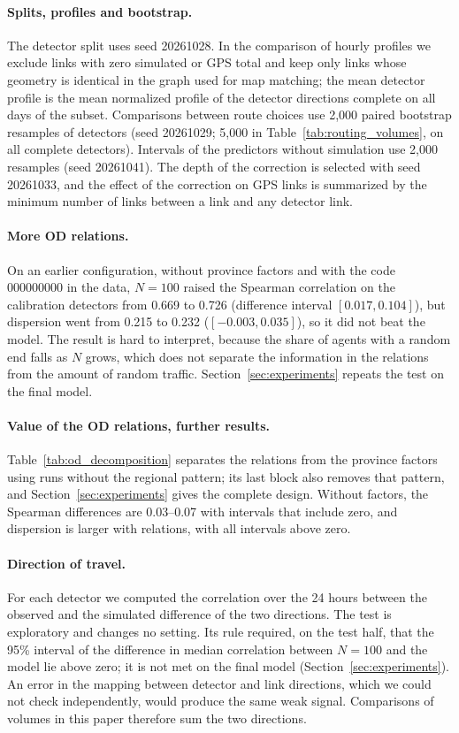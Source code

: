 \documentclass[11pt,a4paper]{article}
\begin{document}
\paragraph{Splits, profiles and bootstrap.} The detector split uses seed 20261028. In the comparison of hourly profiles we exclude links with zero simulated or GPS total and keep only links whose geometry is identical in the graph used for map matching; the mean detector profile is the mean normalized profile of the detector directions complete on all days of the subset. Comparisons between route choices use 2,000 paired bootstrap resamples of detectors (seed 20261029; 5,000 in Table~\ref{tab:routing_volumes}, on all complete detectors). Intervals of the predictors without simulation use 2,000 resamples (seed 20261041). The depth of the correction is selected with seed 20261033, and the effect of the correction on GPS links is summarized by the minimum number of links between a link and any detector link.

\paragraph{More OD relations.} On an earlier configuration, without province factors and with the code 000000000 in the data, $N=100$ raised the Spearman correlation on the calibration detectors from 0.669 to 0.726 (difference interval $[0.017, 0.104]$), but dispersion went from 0.215 to 0.232 ($[-0.003, 0.035]$), so it did not beat the model. The result is hard to interpret, because the share of agents with a random end falls as $N$ grows, which does not separate the information in the relations from the amount of random traffic. Section~\ref{sec:experiments} repeats the test on the final model.

\paragraph{Value of the OD relations, further results.} Table~\ref{tab:od_decomposition} separates the relations from the province factors using runs without the regional pattern; its last block also removes that pattern, and Section~\ref{sec:experiments} gives the complete design. Without factors, the Spearman differences are 0.03--0.07 with intervals that include zero, and dispersion is larger with relations, with all intervals above zero.

\paragraph{Direction of travel.} For each detector we computed the correlation over the 24 hours between the observed and the simulated difference of the two directions. The test is exploratory and changes no setting. Its rule required, on the test half, that the 95\% interval of the difference in median correlation between $N=100$ and the model lie above zero; it is not met on the final model (Section~\ref{sec:experiments}). An error in the mapping between detector and link directions, which we could not check independently, would produce the same weak signal. Comparisons of volumes in this paper therefore sum the two directions.
\end{document}
